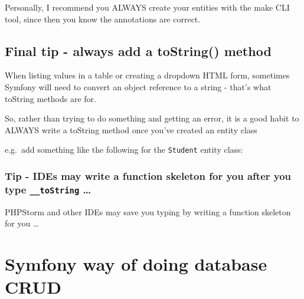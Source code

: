 \documentclass[a4paperpaper,openright]{book}
\newenvironment{Shaded}{}{}
\newcommand{\FunctionTok}[1]{\textcolor[rgb]{0.02,0.16,0.49}{#1}}
\newcommand{\KeywordTok}[1]{\textcolor[rgb]{0.00,0.44,0.13}{\textbf{#1}}}
\newcommand{\NormalTok}[1]{#1}
\newcommand{\OtherTok}[1]{\textcolor[rgb]{0.00,0.44,0.13}{#1}}
\newcommand{\StringTok}[1]{\textcolor[rgb]{0.25,0.44,0.63}{#1}}
\begin{document}
Personally, I recommend you ALWAYS create your entities with the make
CLI tool, since then you know the annotations are correct.

\hypertarget{final-tip---always-add-a-tostring-method}{%
\section{Final tip - always add a toString()
method}\label{final-tip---always-add-a-tostring-method}}

When listing values in a table or creating a dropdown HTML form,
sometimes Symfony will need to convert an object reference to a string -
that's what toString methods are for.

So, rather than trying to do something and getting an error, it is a
good habit to ALWAYS write a toString method once you've created an
entity class

e.g.~add something like the following for the \texttt{Student} entity
class:

\begin{Shaded}
\end{Shaded}

\hypertarget{tip---ides-may-write-a-function-skeleton-for-you-after-you-type-__tostring}{%
\subsection{\texorpdfstring{Tip - IDEs may write a function skeleton for
you after you type \texttt{\_\_toString}
\ldots{}}{Tip - IDEs may write a function skeleton for you after you type \_\_toString \ldots{}}}\label{tip---ides-may-write-a-function-skeleton-for-you-after-you-type-__tostring}}

PHPStorm and other IDEs may save you typing by writing a function
skeleton for you \ldots{}

\hypertarget{symfony-way-of-doing-database-crud}{%
\chapter{Symfony way of doing database
CRUD}\label{symfony-way-of-doing-database-crud}}
\end{document}
